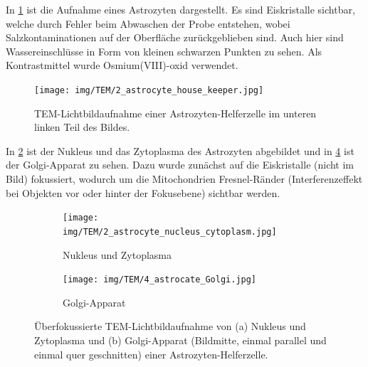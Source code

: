 In \cref{fig:tem:ahk} ist die Aufnahme eines Astrozyten dargestellt.
Es sind Eiskristalle sichtbar, welche durch Fehler beim Abwaschen der Probe entstehen, wobei Salzkontaminationen auf der Oberfläche zurückgeblieben sind.
Auch hier sind Wassereinschlüsse in Form von kleinen schwarzen Punkten zu sehen.
Als Kontrastmittel wurde Osmium(VIII)-oxid verwendet.

\begin{figure}[!ht]
    \centering
    \texttt{[image: img/TEM/2\_astrocyte\_house\_keeper.jpg]}
    \caption{TEM-Lichtbildaufnahme einer Astrozyten-Helferzelle im unteren linken Teil des Bildes.}
    \label{fig:tem:ahk}
\end{figure}

In \cref{fig:tem:anc} ist der Nukleus und das Zytoplasma des Astrozyten abgebildet und in \cref{fig:tem:golgi} ist der Golgi-Apparat zu sehen.
Dazu wurde zunächst auf die Eiskristalle (nicht im Bild) fokussiert, wodurch um die Mitochondrien Fresnel-Ränder (Interferenzeffekt bei Objekten vor oder hinter der Fokusebene) sichtbar werden.

\begin{figure}[H]
    \centering
    \begin{subfigure}{0.465\textwidth}
        \centering
        \texttt{[image: img/TEM/2\_astrocyte\_nucleus\_cytoplasm.jpg]}
        \caption{Nukleus und Zytoplasma}
        \label{fig:tem:anc}
    \end{subfigure}
    \hfill
    \begin{subfigure}{0.465\textwidth}
        \centering
        \texttt{[image: img/TEM/4\_astrocate\_Golgi.jpg]}
        \caption{Golgi-Apparat}
        \label{fig:tem:golgi}
    \end{subfigure}
    \caption{Überfokussierte TEM-Lichtbildaufnahme von (a) Nukleus und Zytoplasma und (b) Golgi-Apparat (Bildmitte, einmal parallel und einmal quer geschnitten) einer Astrozyten-Helferzelle.}
\end{figure}




